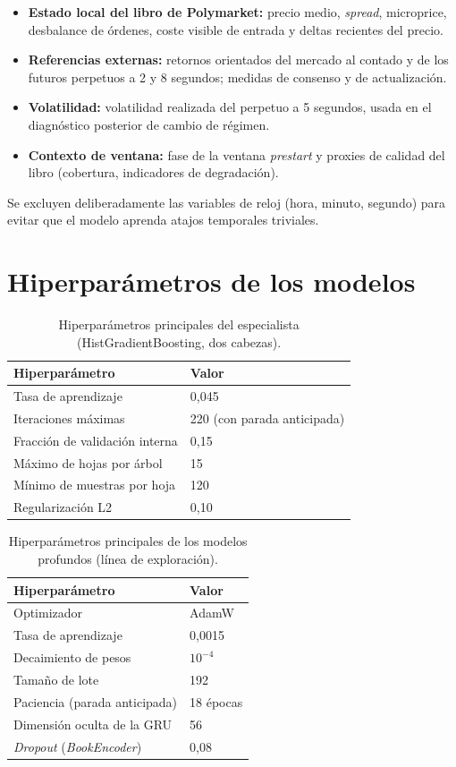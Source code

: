 \begin{itemize}[noitemsep]
\item \textbf{Estado local del libro de Polymarket:} precio medio, \emph{spread}, microprice,
desbalance de órdenes, coste visible de entrada y deltas recientes del precio.
\item \textbf{Referencias externas:} retornos orientados del mercado al contado y de los
futuros perpetuos a 2 y 8 segundos; medidas de consenso y de actualización.
\item \textbf{Volatilidad:} volatilidad realizada del perpetuo a 5 segundos, usada en el
diagnóstico posterior de cambio de régimen.
\item \textbf{Contexto de ventana:} fase de la ventana \emph{prestart} y proxies de calidad del
libro (cobertura, indicadores de degradación).
\end{itemize}

Se excluyen deliberadamente las variables de reloj (hora, minuto, segundo) para evitar que el
modelo aprenda atajos temporales triviales.

\chapter{Hiperparámetros de los modelos}
\label{anexo:hiperparametros}

\begin{table}[h]
\centering
\caption{Hiperparámetros principales del especialista (HistGradientBoosting, dos cabezas).}
\begin{tabular}{ll}
\toprule
\textbf{Hiperparámetro} & \textbf{Valor} \\
\midrule
Tasa de aprendizaje & 0,045 \\
Iteraciones máximas & 220 (con parada anticipada) \\
Fracción de validación interna & 0,15 \\
Máximo de hojas por árbol & 15 \\
Mínimo de muestras por hoja & 120 \\
Regularización L2 & 0,10 \\
\bottomrule
\end{tabular}
\end{table}

\begin{table}[h]
\centering
\caption{Hiperparámetros principales de los modelos profundos (línea de exploración).}
\begin{tabular}{ll}
\toprule
\textbf{Hiperparámetro} & \textbf{Valor} \\
\midrule
Optimizador & AdamW \\
Tasa de aprendizaje & 0,0015 \\
Decaimiento de pesos & $10^{-4}$ \\
Tamaño de lote & 192 \\
Paciencia (parada anticipada) & 18 épocas \\
Dimensión oculta de la GRU & 56 \\
\emph{Dropout} (\emph{BookEncoder}) & 0,08 \\
\bottomrule
\end{tabular}
\end{table}

